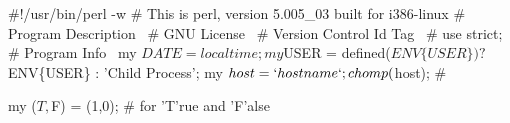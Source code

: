 \documentclass[11pt]{article}
\def\nwendcode{\endtrivlist \endgroup} %
\let\nwdocspar=\par                    %
\begin{document}
\label{todo:AAA}
\nwenddocs{}%
%
\nwdocspar
\nwenddocs{}%
%
\nwdocspar
\todo{ \item \todoAAA } %

\label{todo:BAA}
\nwenddocs{}%
%
%
%
%
%
%
%
%
%
%
%
%
%
%
%
%
%
%
%
%
\nwdocspar
\nwenddocs{}%
%
\nwdocspar
\todo{ \item \todoBAA } %

\begin{comment}
\end{comment}


% 
% 
% 

\newpage %
\appendix



\begin{comment}
\end{comment}

%
\newpage %



\nwenddocs{}\endmoddef
#!/usr/bin/perl -w
# This is perl, version 5.005_03 built for i386-linux
#
\LA{}Program Description~{\nwtagstyle{}}\RA{}
#
\LA{}GNU License~{\nwtagstyle{}}\RA{}
#
\LA{}Version Control Id Tag~{\nwtagstyle{}}\RA{}
#
use strict;
#
\LA{}Program Info~{\nwtagstyle{}}\RA{}
my $DATE = localtime;
my $USER = defined($ENV\{USER\}) ? $ENV\{USER\} : 'Child Process';
my $host = `hostname`;
chomp($host);
#
\nwendcode{}\nwdocspar

\nwenddocs{}\endmoddef
my ($T,$F) = (1,0); # for 'T'rue and 'F'alse
\eatline
{}\nwendcode{}\nwdocspar
\end{document}
